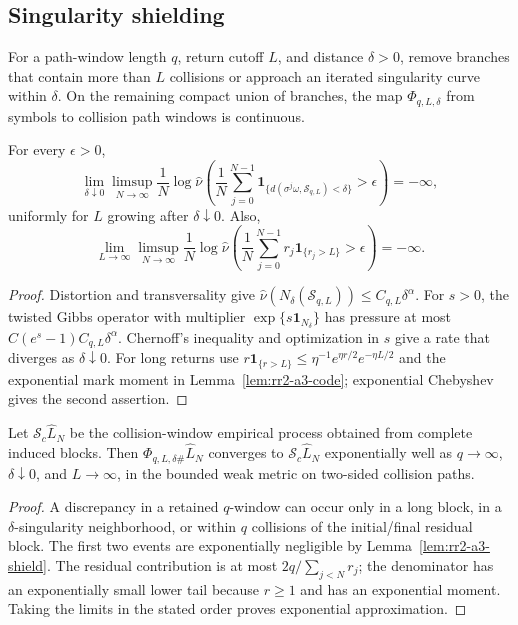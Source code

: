 \subsection{Singularity shielding}

For a path-window length \(q\), return cutoff \(L\), and distance
\(\delta>0\), remove branches that contain more than \(L\) collisions or
approach an iterated singularity curve within \(\delta\).  On the remaining
compact union of branches, the map \(\Phi_{q,L,\delta}\) from symbols to
collision path windows is continuous.

\begin{lemma}
\label{lem:rr2-a3-shield}
For every \(\epsilon>0\),
\[
 \lim_{\delta\downarrow0}\limsup_{N\to\infty}
 \frac1N\log\widehat\nu\!\left(
 \frac1N\sum_{j=0}^{N-1}
 \mathbf1_{\{d(\sigma^j\omega,\mathcal S_{q,L})<\delta\}}
 >\epsilon\right)=-\infty,
\]
uniformly for \(L\) growing after \(\delta\downarrow0\).  Also,
\[
 \lim_{L\to\infty}\limsup_{N\to\infty}
 \frac1N\log\widehat\nu\!\left(
 \frac1N\sum_{j=0}^{N-1}r_j\mathbf1_{\{r_j>L\}}>\epsilon
 \right)=-\infty .
\]
\end{lemma}

\begin{proof}
Distortion and transversality give
\(\widehat\nu(N_\delta(\mathcal S_{q,L}))\le C_{q,L}\delta^\alpha\).
For \(s>0\), the twisted Gibbs operator with multiplier
\(\exp\{s\mathbf1_{N_\delta}\}\) has pressure at most
\(C(e^s-1)C_{q,L}\delta^\alpha\).  Chernoff's inequality and optimization in
\(s\) give a rate that diverges as \(\delta\downarrow0\).
For long returns use
\(r\mathbf1_{\{r>L\}}\le \eta^{-1}e^{\eta r/2}e^{-\eta L/2}\)
and the exponential mark moment in Lemma~\ref{lem:rr2-a3-code}; exponential
Chebyshev gives the second assertion.
\end{proof}

\begin{theorem}
\label{thm:rr2-a3-exp-good}
Let \(\mathscr S_c\widehat L_N\) be the collision-window empirical process
obtained from complete induced blocks.  Then
\(\Phi_{q,L,\delta\#}\widehat L_N\) converges to
\(\mathscr S_c\widehat L_N\) exponentially well as
\(q\to\infty\), \(\delta\downarrow0\), and \(L\to\infty\), in the bounded
weak metric on two-sided collision paths.
\end{theorem}

\begin{proof}
A discrepancy in a retained \(q\)-window can occur only in a long block, in
a \(\delta\)-singularity neighborhood, or within \(q\) collisions of the
initial/final residual block.  The first two events are exponentially
negligible by Lemma~\ref{lem:rr2-a3-shield}.  The residual contribution is at
most \(2q/\sum_{j<N}r_j\); the denominator has an exponentially small lower
tail because \(r\ge1\) and has an exponential moment.  Taking the limits in
the stated order proves exponential approximation.
\end{proof}


